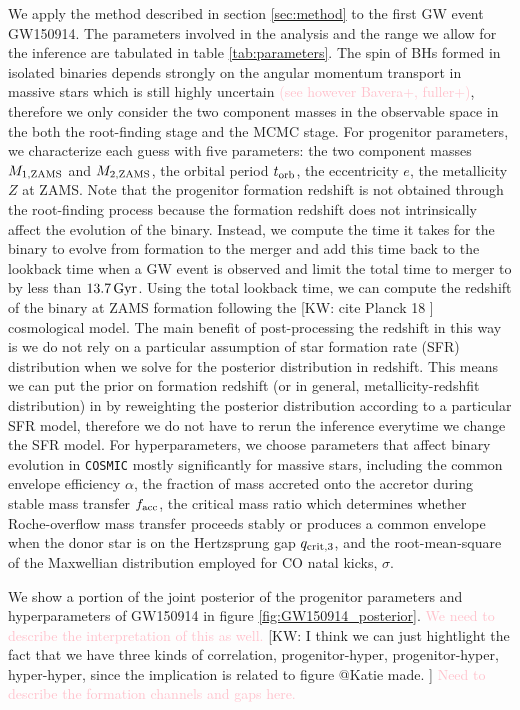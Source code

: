 \documentclass[twocolumn]{aastex631}
\newcommand{\kw}[1]{{\color{rb4}[KW: #1 ]}}
\newcommand{\kb}[1]{\textcolor{pink}{#1}}
\begin{document}
We apply the method described in section \ref{sec:method} to the first GW event GW150914.
The parameters involved in the analysis and the range we allow for the inference are tabulated in table \ref{tab:parameters}.
The spin of BHs formed in isolated binaries depends strongly on the angular 
momentum transport in massive stars which is still highly uncertain \kb{(see however Bavera+, fuller+)},
therefore we only consider the two component masses in the observable space in the both the 
root-finding stage and the MCMC stage. For progenitor parameters, we characterize each guess with 
five parameters: the two component masses $M_{\rm 1,ZAMS}$ and $M_{\rm 2,ZAMS}$, the orbital period $t_{\rm orb}$, 
the eccentricity $e$, the metallicity $Z$ at ZAMS. Note that the progenitor formation redshift is not 
obtained through the root-finding process because the formation redshift does not intrinsically affect 
the evolution of the binary. Instead, we compute the time it takes for the binary to evolve from 
formation to the merger and add this time back to the lookback time when a GW event is observed and limit the total 
time to merger to by less than $13.7\,\rm{Gyr}$.
Using the total lookback time, we can compute the redshift of the binary at ZAMS formation following the 
\kw{cite Planck 18} cosmological model.
The main benefit of post-processing the redshift in this way is we do not rely on a particular assumption
of star formation rate (SFR) distribution when we solve for the posterior distribution in redshift.
This means we can put the prior on formation redshift (or in general, metallicity-redshfit distribution) in
by reweighting the posterior distribution according to a particular SFR model,
therefore we do not have to rerun the inference everytime we change the SFR model.
For hyperparameters, we choose parameters that affect 
binary evolution in \texttt{COSMIC} mostly significantly for massive stars, including the common envelope 
efficiency $\alpha$, the fraction of mass accreted onto the accretor during stable mass transfer $f_{\rm acc}$, 
the critical mass ratio which determines whether Roche-overflow mass transfer 
proceeds stably or produces a common envelope when the donor star is on the Hertzsprung gap 
$q_{\rm crit,3}$, and the root-mean-square of the Maxwellian distribution
employed for CO natal kicks, $\sigma$. 

We show a portion of the joint posterior of the progenitor parameters 
and hyperparameters of GW150914 in figure \ref{fig:GW150914_posterior}.
\kb{We need to describe the interpretation of this as well.}
\kw{I think we can just hightlight the fact that we have three kinds of correlation, progenitor-hyper, progenitor-hyper, hyper-hyper,
since the implication is related to figure @Katie made.}
\kb{Need to describe the formation channels and gaps here.}
\end{document}

